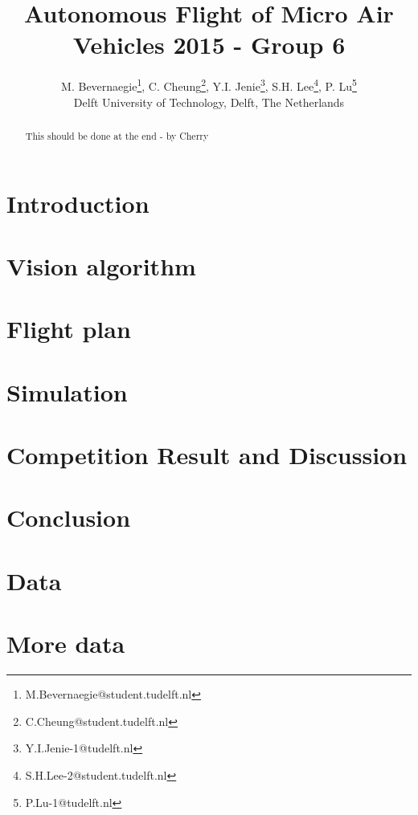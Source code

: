 \documentclass{article}
\title{Autonomous Flight of Micro Air Vehicles 2015 - Group 6}
\author{M. Bevernaegie\thanks{M.Bevernaegie@student.tudelft.nl}, C. Cheung\thanks{C.Cheung@student.tudelft.nl}, Y.I. Jenie\thanks{Y.I.Jenie-1@tudelft.nl}, S.H. Lee\thanks{S.H.Lee-2@student.tudelft.nl}, P. Lu\thanks{P.Lu-1@tudelft.nl} \\ Delft University of Technology, Delft, The Netherlands}
\begin{document}
\maketitle

\begin{abstract}
{\color{red} This should be done at the end - by Cherry}
\end{abstract}

\section{Introduction} \label{section:introduction}



\section{Vision algorithm}



\section{Flight plan}




\section{Simulation}
\label{section:simulation}



\section{Competition Result and Discussion}

\section{Conclusion}





\appendix
\newcommand{\appsection}[1]{\let\oldthesection\thesection
  \renewcommand{\thesection}{Appendix \oldthesection:}
  \section{#1}\let\thesection\oldthesection}

\appsection{Data}
\appsection{More data}
\end{document}
